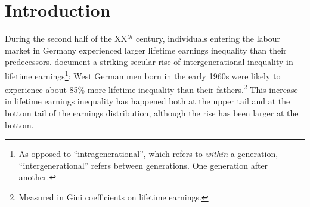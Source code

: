 \documentclass[12pt, a4paper]{article}
\let\Oldsection\section
\renewcommand{\section}{\FloatBarrier\Oldsection}
\begin{document}
\newpage
\setcounter{page}{1}

\setlength{\parindent}{10pt}
\section{Introduction}


During the second half of the XX$^{th}$ century, individuals entering the labour market in Germany experienced larger lifetime earnings inequality than their predecessors. \cite{BoCo15} document a striking secular rise of intergenerational inequality in lifetime earnings\footnote{As opposed to ``intragenerational'', which refers to \emph{within} a generation, ``intergenerational'' refers between generations. One generation after another.}: West German men born in the early 1960s were likely to experience about 85\% more lifetime inequality than their fathers.\footnote{Measured in Gini coefficients on lifetime earnings.} This increase in lifetime earnings inequality has happened both at the upper tail and at the bottom tail of the earnings distribution, although the rise has been larger at the bottom. 


\end{document}
